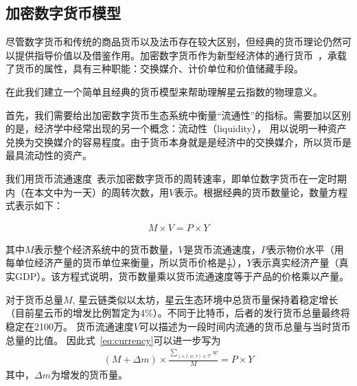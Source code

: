 \subsection{加密数字货币模型}
尽管数字货币和传统的商品货币以及法币存在较大区别，但经典的货币理论仍然可以提供指导价值以及借鉴作用。加密数字货币作为新型经济体的通行货币~\cite{swan2015blockchain}，承载了货币的属性，具有三种职能：交换媒介、计价单位和价值储藏手段。


在此我们建立一个简单且经典的货币模型来帮助理解星云指数的物理意义。

首先，我们需要给出加密数字货币生态系统中衡量“流通性”的指标。需要加以区别的是，经济学中经常出现的另一个概念：流动性（liquidity），
用以说明一种资产兑换为交换媒介的容易程度。由于货币本身就是是经济中的交换媒介，所以货币是最具流动性的资产。


我们用货币流通速度~\cite{selden}表示加密数字货币的周转速率，即单位数字货币在一定时期内（在本文中为一天）的周转次数，用$V$表示。根据经典的货币数量论，数量方程式表示如下：

\begin{align}
M\times V=P\times Y
\label{eq:currency}
\end{align}

其中$M$表示整个经济系统中的货币数量，$V$是货币流通速度，$P$表示物价水平（用每单位经济产量的货币单位来衡量，所以货币价格是$\frac{1}{P}$），$Y$表示真实经济产量（真实GDP）。该方程式说明，货币数量乘以货币流通速度等于产品的价格乘以产量。


对于货币总量$M$, 星云链类似以太坊，星云生态环境中总货币量保持着稳定增长（目前星云币的增发比例暂定为4\%）。不同于比特币，后者的发行货币总量最终将稳定在2100万。
货币流通速度$V$可以描述为一段时间内流通的货币总量与当时货币总量的比值。
因此式~\ref{eq:currency}可以进一步写为
\begin{align}
(M + \Delta{m}) \times \frac{\sum_{(s, t, w, \tau)\in \mathcal{T}}{w}}{M} = P \times Y
\label{eq:cur_ext}
\end{align}
\noindent 其中，$\Delta{m}$为增发的货币量。


